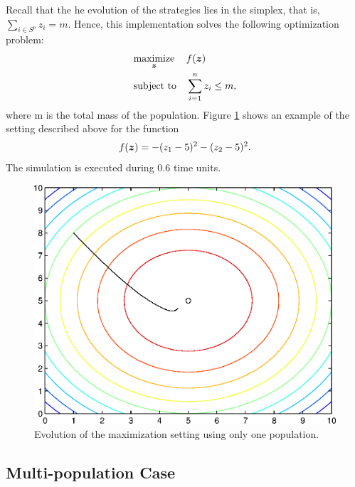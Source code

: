 
Recall that the he evolution of the strategies lies in the simplex, that is, $\sum_{i \in S^p} z_i = m$. Hence, this implementation solves the following optimization problem:
\begin{equation}
\begin{aligned}
& \underset{\boldsymbol{z}}{\text{maximize}}
& &  f(\boldsymbol{z}) \\
& \text{subject to}
& & \sum_{i=1}^n z_i \leq m,
\end{aligned}
\label{eq:opt_problem}
\end{equation}
where m is the total mass of the population.
%
Figure \ref{fig:maximization_a} shows an example of the setting described above for the  function
\begin{equation}\label{eq:objective_f}
 f(\boldsymbol{z}) = - (z_1-5)^2 - (z_2-5)^2.
\end{equation}
The simulation is executed during $0.6$ time units. 

\begin{figure}[htb]
\centering
 \includegraphics[width=.5\textwidth]{./images/maximization_a.eps}
 \caption{Evolution of the maximization setting using only one population.}
 \label{fig:maximization_a}
\end{figure}



\subsection{Multi-population Case}



